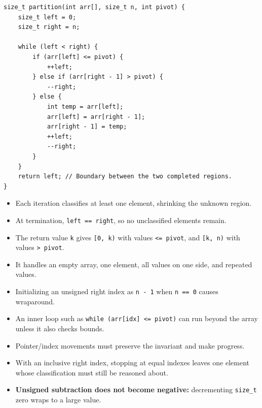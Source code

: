 \documentclass[11pt,a4paper]{article}
\providecommand{\tightlist}{\setlength{\itemsep}{0pt}\setlength{\parskip}{0pt}}
\begin{document}
\begin{lstlisting}[style=cscode]
size_t partition(int arr[], size_t n, int pivot) {
    size_t left = 0;
    size_t right = n;

    while (left < right) {
        if (arr[left] <= pivot) {
            ++left;
        } else if (arr[right - 1] > pivot) {
            --right;
        } else {
            int temp = arr[left];
            arr[left] = arr[right - 1];
            arr[right - 1] = temp;
            ++left;
            --right;
        }
    }
    return left; // Boundary between the two completed regions.
}
\end{lstlisting}

\begin{itemize}
\tightlist
\item
  Each iteration classifies at least one element, shrinking the unknown region.
\item
  At termination, \texttt{left\ ==\ right}, so no unclassified elements remain.
\item
  The return value \texttt{k} gives \texttt{{[}0,\ k)} with values \texttt{\textless{}=\ pivot}, and \texttt{{[}k,\ n)} with values \texttt{\textgreater{}\ pivot}.
\item
  It handles an empty array, one element, all values on one side, and repeated values.
\end{itemize}

\label{mistakes-illustrated-in-the-slides}
\hypertarget{mistakes-illustrated-in-the-slides}{}

\begin{itemize}
\tightlist
\item
  Initializing an unsigned right index as \texttt{n\ -\ 1} when \texttt{n\ ==\ 0} causes wraparound.
\item
  An inner loop such as \texttt{while\ (arr{[}idx{]}\ \textless{}=\ pivot)} can run beyond the array unless it also checks bounds.
\item
  Pointer/index movements must preserve the invariant and make progress.
\item
  With an inclusive right index, stopping at equal indexes leaves one element whose classification must still be reasoned about.
\item
  \textbf{Unsigned subtraction does not become negative:} decrementing \texttt{size\_t} zero wraps to a large value.
\end{itemize}

\label{l9.-static-lifetimes-file-scope-and-input}
\hypertarget{l9.-static-lifetimes-file-scope-and-input}{}
\end{document}
